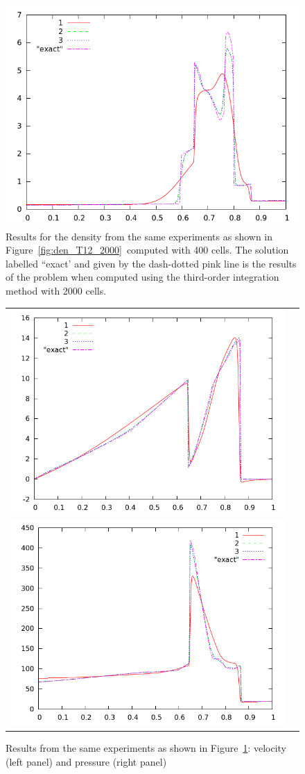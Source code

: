 \documentclass[10pt]{article}
\begin{document}
\begin{figure}[h]
  \begin{center}
     \includegraphics[width=.95\textwidth]{den_T12_400.png}	
  \end{center}
  \caption{Results for the density from the same experiments as shown in Figure~\ref{fig:den_T12_2000}~computed with 400 cells. The solution labelled ``exact' and given by the dash-dotted pink line is the results of the problem when computed using the third-order integration method with 2000 cells.}
  \label{fig:den_T12_400}
\end{figure}

\begin{figure}[h]
  \begin{center}
	\begin{tabular}{cc}
     \includegraphics[width=.475\textwidth]{vel_T12_400.png}
     \includegraphics[width=.475\textwidth]{prs_T12_400.png}	
    \end{tabular}
  \end{center}
  \caption{Results from the same experiments as shown in Figure~\ref{fig:den_T12_400}:
  velocity (left panel) and pressure (right panel)}
\end{figure}
\end{document}
